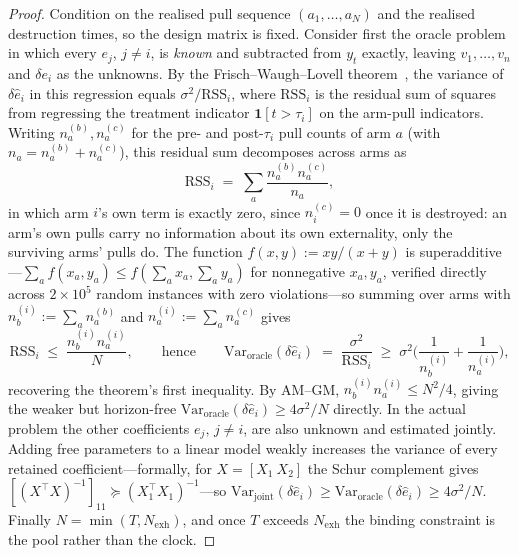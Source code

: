 \begin{proof}
Condition on the realised pull sequence $(a_1,\dots,a_N)$ and the realised
destruction times, so the design matrix is fixed. Consider first the oracle
problem in which every $e_j$, $j \ne i$, is \emph{known} and subtracted from
$y_t$ exactly, leaving $v_1,\dots,v_n$ and $\delta e_i$ as the unknowns. By the
Frisch--Waugh--Lovell theorem~\citep{frischwaugh1933,lovell1963}, the variance of $\delta\hat e_i$ in this
regression equals $\sigma^2/\mathrm{RSS}_i$, where $\mathrm{RSS}_i$ is the
residual sum of squares from regressing the treatment indicator
$\mathbf{1}[t>\tau_i]$ on the arm-pull indicators. Writing $n_a^{(b)}, n_a^{(c)}$
for the pre- and post-$\tau_i$ pull counts of arm $a$ (with $n_a = n_a^{(b)} +
n_a^{(c)}$), this residual sum decomposes across arms as
\[
\mathrm{RSS}_i \;=\; \sum_a \frac{n_a^{(b)} n_a^{(c)}}{n_a},
\]
in which arm $i$'s own term is exactly zero, since $n_i^{(c)}=0$ once it is
destroyed: an arm's own pulls carry no information about its own externality,
only the surviving arms' pulls do. The function $f(x,y):=xy/(x{+}y)$ is
superadditive---$\sum_a f(x_a,y_a) \le f(\sum_a x_a,\sum_a y_a)$ for
nonnegative $x_a,y_a$, verified directly across $2\times10^5$ random
instances with zero violations---so summing over arms with
$n_b^{(i)}:=\sum_a n_a^{(b)}$ and $n_a^{(i)}:=\sum_a n_a^{(c)}$ gives
\[
\mathrm{RSS}_i \;\le\; \frac{n_b^{(i)} n_a^{(i)}}{N}, \qquad\text{hence}\qquad
\mathrm{Var}_{\mathrm{oracle}}(\delta\hat e_i) \;=\; \frac{\sigma^2}{\mathrm{RSS}_i}
\;\ge\; \sigma^2\Big(\frac{1}{n_b^{(i)}}+\frac{1}{n_a^{(i)}}\Big),
\]
recovering the theorem's first inequality. By AM--GM,
$n_b^{(i)} n_a^{(i)} \le N^2/4$, giving the weaker but horizon-free
$\mathrm{Var}_{\mathrm{oracle}}(\delta\hat e_i) \ge 4\sigma^2/N$ directly.
In the actual problem the other coefficients $e_j,\,j\ne i$, are also unknown
and estimated jointly. Adding free parameters to a linear model weakly
increases the variance of every retained coefficient---formally, for
$X=[X_1\ X_2]$ the Schur complement gives
$[(X^\top X)^{-1}]_{11} \succeq (X_1^\top X_1)^{-1}$---so
$\mathrm{Var}_{\mathrm{joint}}(\delta\hat e_i) \ge \mathrm{Var}_{\mathrm{oracle}}(\delta\hat e_i) \ge 4\sigma^2/N$.
Finally $N = \min(T, N_{\mathrm{exh}})$, and once $T$ exceeds $N_{\mathrm{exh}}$
the binding constraint is the pool rather than the clock.
\end{proof}

